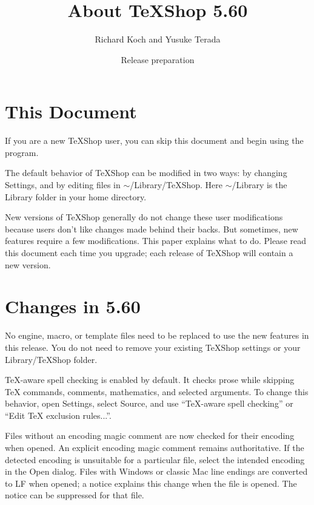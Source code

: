\documentclass[11pt, oneside]{amsart}
\title{About TeXShop 5.60}
\author{Richard Koch and Yusuke Terada}
\date{Release preparation}
\begin{document}
\maketitle

\thispagestyle{empty}
\vspace{-.3in}
\section{This Document}

If you are a new TeXShop user, you can skip this document and begin using the program.

The default behavior of TeXShop can be modified in two ways: by changing Settings, and by editing files in $\sim$/Library/TeXShop. Here $\sim$/Library is the Library folder in your home directory.

New versions of TeXShop generally do not change these user modifications because users don't like changes made behind their backs. But sometimes, new features require a few modifications. This paper explains what to do.
Please read this document each time you upgrade; each release of TeXShop will contain a new version.

\section{Changes in 5.60}

No engine, macro, or template files need to be replaced to use the new features in this release. You do not need to remove your existing TeXShop settings or your Library/TeXShop folder.

TeX-aware spell checking is enabled by default. It checks prose while skipping TeX commands, comments, mathematics, and selected arguments. To change this behavior, open Settings, select Source, and use ``TeX-aware spell checking'' or ``Edit TeX exclusion rules...''.

Files without an encoding magic comment are now checked for their encoding when opened. An explicit encoding magic comment remains authoritative. If the detected encoding is unsuitable for a particular file, select the intended encoding in the Open dialog. Files with Windows or classic Mac line endings are converted to LF when opened; a notice explains this change when the file is opened. The notice can be suppressed for that file.
\end{document}
